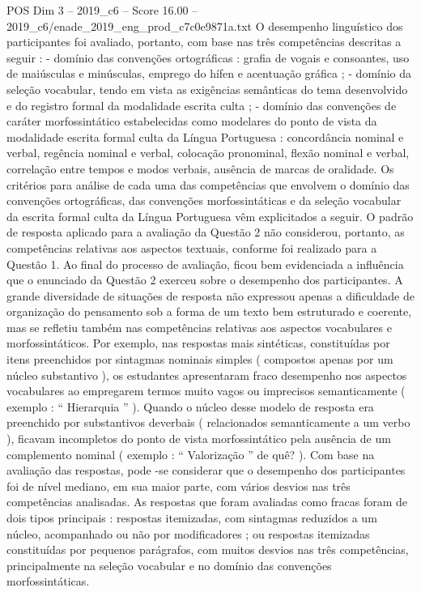 \begin{textsample}{POS Dim 3 – 2019\_c6 – Score 16.00 – 2019\_c6/enade\_2019\_eng\_prod\_c7c0e9871a.txt}
O desempenho linguístico dos participantes foi avaliado, portanto, com base nas três competências descritas a seguir : - domínio das convenções ortográficas : grafia de vogais e consoantes, uso de maiúsculas e minúsculas, emprego do hífen e acentuação gráfica ; - domínio da seleção vocabular, tendo em vista as exigências semânticas do tema desenvolvido e do registro formal da modalidade escrita culta ; - domínio das convenções de caráter morfossintático estabelecidas como modelares do ponto de vista da modalidade escrita formal culta da Língua Portuguesa : concordância nominal e verbal, regência nominal e verbal, colocação pronominal, flexão nominal e verbal, correlação entre tempos e modos verbais, ausência de marcas de oralidade.
Os critérios para análise de cada uma das competências que envolvem o domínio das convenções ortográficas, das convenções morfossintáticas e da seleção vocabular da escrita formal culta da Língua Portuguesa vêm explicitados a seguir.
O padrão de resposta aplicado para a avaliação da Questão 2 não considerou, portanto, as competências relativas aos aspectos textuais, conforme foi realizado para a Questão 1.
Ao final do processo de avaliação, ficou bem evidenciada a influência que o enunciado da Questão 2 exerceu sobre o desempenho dos participantes.
A grande diversidade de situações de resposta não expressou apenas a dificuldade de organização do pensamento sob a forma de um texto bem estruturado e coerente, mas se refletiu também nas competências relativas aos aspectos vocabulares e morfossintáticos.
Por exemplo, nas respostas mais sintéticas, constituídas por itens preenchidos por sintagmas nominais simples ( compostos apenas por um núcleo substantivo ), os estudantes apresentaram fraco desempenho nos aspectos vocabulares ao empregarem termos muito vagos ou imprecisos semanticamente ( exemplo : “ Hierarquia ” ).
Quando o núcleo desse modelo de resposta era preenchido por substantivos deverbais ( relacionados semanticamente a um verbo ), ficavam incompletos do ponto de vista morfossintático pela ausência de um complemento nominal ( exemplo : “ Valorização ” de quê? ).
Com base na avaliação das respostas, pode -se considerar que o desempenho dos participantes foi de nível mediano, em sua maior parte, com vários desvios nas três competências analisadas.
As respostas que foram avaliadas como fracas foram de dois tipos principais : respostas itemizadas, com sintagmas reduzidos a um núcleo, acompanhado ou não por modificadores ; ou respostas itemizadas constituídas por pequenos parágrafos, com muitos desvios nas três competências, principalmente na seleção vocabular e no domínio das convenções morfossintáticas.

\end{textsample}
